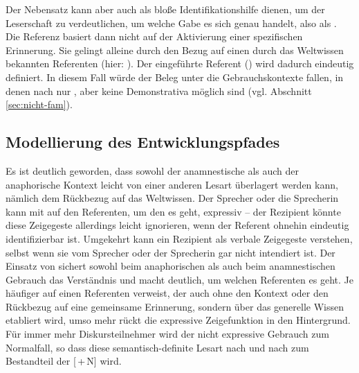 \noindent 
Der Nebensatz kann aber auch als bloße Identifikationshilfe dienen, um der Leserschaft zu verdeutlichen, um welche Gabe es sich genau handelt, also als  \parencite[79]{Himmelmann1997}. Die Referenz  basiert dann nicht auf der Aktivierung einer spezifischen Erinnerung. Sie gelingt alleine durch den Bezug auf einen durch das Weltwissen bekannten Referenten (hier: ). Der eingeführte Referent () wird dadurch eindeutig definiert.  In diesem Fall würde der Beleg unter die  Gebrauchskontexte fallen, in denen nach \textcite{Hawkins1978} nur , aber keine Demonstrativa  möglich sind (vgl. Abschnitt \ref{sec:nicht-fam}). 

%
%

\subsection{Modellierung des Entwicklungspfades}\label{sec:disk-entwicklung}\largerpage[.25]

Es ist deutlich geworden, dass sowohl der anamnestische  als auch der anaphorische  Kontext leicht von einer anderen Lesart überlagert werden kann, nämlich dem Rückbezug auf das Weltwissen. Der Sprecher oder die Sprecherin kann mit   auf den Referenten, um den es geht, expressiv  -- der Rezipient könnte diese Zeigegeste allerdings leicht ignorieren, wenn der Referent ohnehin eindeutig identifizierbar ist. Umgekehrt kann ein Rezipient  als verbale Zeigegeste verstehen, selbst wenn sie vom Sprecher oder der Sprecherin gar nicht intendiert ist.
Der Einsatz von  sichert sowohl beim anaphorischen  als auch beim anamnestischen  Gebrauch das Verständnis und macht deutlich, um welchen Referenten es geht. Je häufiger  auf einen Referenten verweist, der auch ohne den Kontext oder den Rückbezug auf eine gemeinsame Erinnerung, sondern über das generelle Wissen etabliert wird, umso mehr rückt die expressive Zeigefunktion in den Hintergrund. Für immer mehr Diskursteilnehmer wird der nicht expressive Gebrauch zum Normalfall, so dass diese semantisch-definite  Lesart nach und nach zum Bestandteil der [\,+\,N] wird. 

